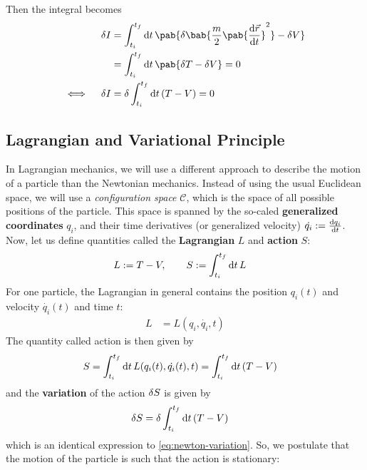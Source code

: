 Then the integral becomes
\begin{align}
  \fdif{I}            & = \int_{t_i}^{t_f} \odif{t} \, \pab{
    \delta \bab{\frac{m}{2} \pab{\odv{\vec{r}}{t}}^2}
    - \fdif{V}
  }                                                                                                   \\
                      & = \int_{t_i}^{t_f} \odif{t} \, \pab{
    \fdif{T} - \fdif{V}
  } = 0                                                                                               \\
  \iff \quad \fdif{I} & = \delta \int_{t_i}^{t_f} \odif{t} \, (T - V) = 0 \label{eq:newton-variation}
\end{align}
\cite{maeno-leastAction}


\subsection{Lagrangian and Variational Principle}
In Lagrangian mechanics, we will use a different approach to describe the motion of a particle than the Newtonian mechanics.
Instead of using the usual Euclidean space, we will use a \textit{configuration space} $\mathcal{C}$, which is the space of all possible positions of the particle.
This space is spanned by the so-caled \textbf{generalized coordinates} $q_i$, and their time derivatives (or generalized velocity) $\dot{q_i} := \odv{q_i}{t}$.
Now, let us define quantities called the \textbf{Lagrangian} $L$ and \textbf{action} $S$:
\begin{align}
  L & := T - V, \qquad  S := \int_{t_i}^{t_f} \odif{t} \, L
\end{align}
For one particle, the Lagrangian in general contains the position $q_i(t)$ and velocity $\dot{q_i}(t)$ and time $t$:
\begin{align}
  L & = L(q_i, \dot{q_i}, t)
\end{align}
The quantity called action is then given by
\begin{align}
  S & = \int_{t_i}^{t_f} \odif{t} \, L(q_i(t), \dot{q_i}(t), t) = \int_{t_i}^{t_f} \odif{t} \, (T - V)
\end{align}
and the \textbf{variation} of the action $\fdif{S}$ is given by
\begin{align}
  \fdif{S} & = \delta \int_{t_i}^{t_f} \odif{t} \, (T - V)
\end{align}
which is an identical expression to \eqref{eq:newton-variation}.
So, we postulate that the motion of the particle is such that the action is stationary:

